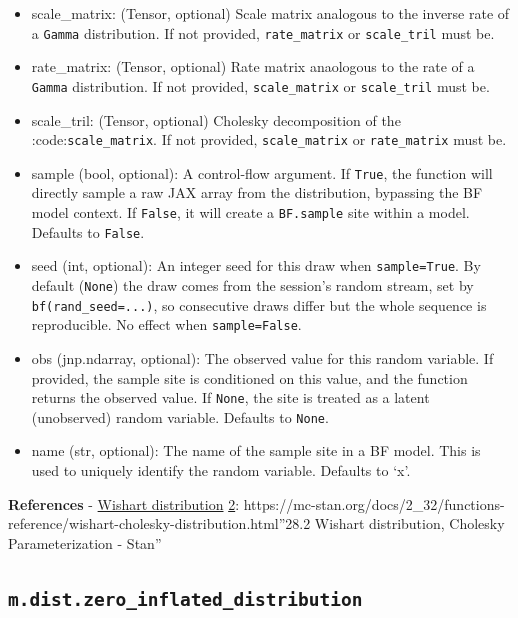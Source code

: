 \documentclass[
  letterpaper,
  DIV=11,
  numbers=noendperiod]{scrartcl}
\begin{document}
\begin{itemize}
\item
  scale\_matrix: (Tensor, optional) Scale matrix analogous to the
  inverse rate of a \texttt{Gamma} distribution. If not provided,
  \texttt{rate\_matrix} or \texttt{scale\_tril} must be.
\item
  rate\_matrix: (Tensor, optional) Rate matrix anaologous to the rate of
  a \texttt{Gamma} distribution. If not provided, \texttt{scale\_matrix}
  or \texttt{scale\_tril} must be.
\item
  scale\_tril: (Tensor, optional) Cholesky decomposition of the
  :code:\texttt{scale\_matrix}. If not provided, \texttt{scale\_matrix}
  or \texttt{rate\_matrix} must be.
\item
  sample (bool, optional): A control-flow argument. If \texttt{True},
  the function will directly sample a raw JAX array from the
  distribution, bypassing the BF model context. If \texttt{False}, it
  will create a \texttt{BF.sample} site within a model. Defaults to
  \texttt{False}.
\item
  seed (int, optional): An integer seed for this draw when
  \texttt{sample=True}. By default (\texttt{None}) the draw comes from
  the session's random stream, set by \texttt{bf(rand\_seed=...)}, so
  consecutive draws differ but the whole sequence is reproducible. No
  effect when \texttt{sample=False}.
\item
  obs (jnp.ndarray, optional): The observed value for this random
  variable. If provided, the sample site is conditioned on this value,
  and the function returns the observed value. If \texttt{None}, the
  site is treated as a latent (unobserved) random variable. Defaults to
  \texttt{None}.
\item
  name (str, optional): The name of the sample site in a BF model. This
  is used to uniquely identify the random variable. Defaults to `x'.
\end{itemize}

\textbf{References} -
\href{https://en.wikipedia.org/wiki/Wishart_distribution}{Wishart
distribution} \href{https://statproofbook.github.io/P/matn-pdf.html}{2}:
https://mc-stan.org/docs/2\_32/functions-reference/wishart-cholesky-distribution.html''28.2
Wishart distribution, Cholesky Parameterization - Stan''

\subsection{\texorpdfstring{\texttt{m.dist.zero\_inflated\_distribution}}{m.dist.zero\_inflated\_distribution}}\label{zero_inflated_distribution}
\end{document}
